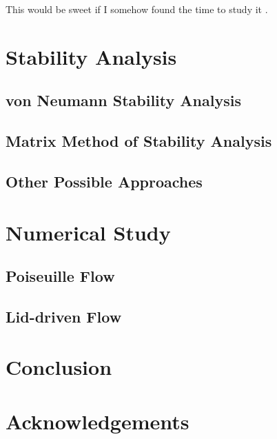 \documentclass{article}
\begin{document}
{\color{red} This would be sweet if I somehow found the time to study it \cite{gorban2014enhancement}.}

\section{Stability Analysis}

\subsection{von Neumann Stability Analysis}

\subsection{Matrix Method of Stability Analysis}

\subsection{Other Possible Approaches}

\section{Numerical Study}

\subsection{Poiseuille Flow}

\subsection{Lid-driven Flow}

\section{Conclusion}

\section*{Acknowledgements}



	
\end{document}
